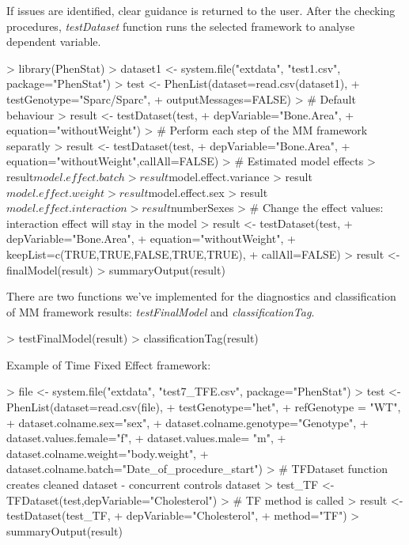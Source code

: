 \documentclass[a4paper]{article}
\begin{document}
If issues are identified, clear guidance is returned to the user. 
After the checking procedures, \textit{testDataset} function runs the selected framework to analyse dependent variable. 
\begin{Schunk}
\begin{Sinput}
> library(PhenStat)
> dataset1 <- system.file("extdata", "test1.csv", package="PhenStat")
> test <- PhenList(dataset=read.csv(dataset1),
+         testGenotype="Sparc/Sparc", 
+         outputMessages=FALSE)
> # Default behaviour
> result <- testDataset(test,
+         depVariable="Bone.Area", 
+         equation="withoutWeight")
> # Perform each step of the MM framework separatly
> result <- testDataset(test,
+         depVariable="Bone.Area", 
+         equation="withoutWeight",callAll=FALSE)
> # Estimated model effects
> result$model.effect.batch
> result$model.effect.variance
> result$model.effect.weight
> result$model.effect.sex
> result$model.effect.interaction
> result$numberSexes
> # Change the effect values: interaction effect will stay in the model
> result <- testDataset(test,
+         depVariable="Bone.Area", 
+         equation="withoutWeight",
+         keepList=c(TRUE,TRUE,FALSE,TRUE,TRUE),
+         callAll=FALSE)
> result <- finalModel(result)
> summaryOutput(result)
\end{Sinput}
\end{Schunk}

There are two functions we've implemented for the diagnostics and classification of MM framework results: \textit{testFinalModel} and \textit{classificationTag}.

\begin{Schunk}
\begin{Sinput}
> testFinalModel(result)
> classificationTag(result)
\end{Sinput}
\end{Schunk}


Example of Time Fixed Effect framework:

\begin{Schunk}
\begin{Sinput}
> file <- system.file("extdata", "test7_TFE.csv", package="PhenStat")
> test <- PhenList(dataset=read.csv(file),
+                      testGenotype="het",
+                      refGenotype = "WT",
+                      dataset.colname.sex="sex",
+                      dataset.colname.genotype="Genotype",
+                      dataset.values.female="f",
+                      dataset.values.male= "m",
+                      dataset.colname.weight="body.weight",
+                      dataset.colname.batch="Date_of_procedure_start")
> # TFDataset function creates cleaned dataset - concurrent controls dataset
> test_TF <- TFDataset(test,depVariable="Cholesterol")
> # TF method is called
> result  <- testDataset(test_TF,
+                            depVariable="Cholesterol",
+                            method="TF")
> summaryOutput(result)
\end{Sinput}
\end{Schunk}
\end{document}
